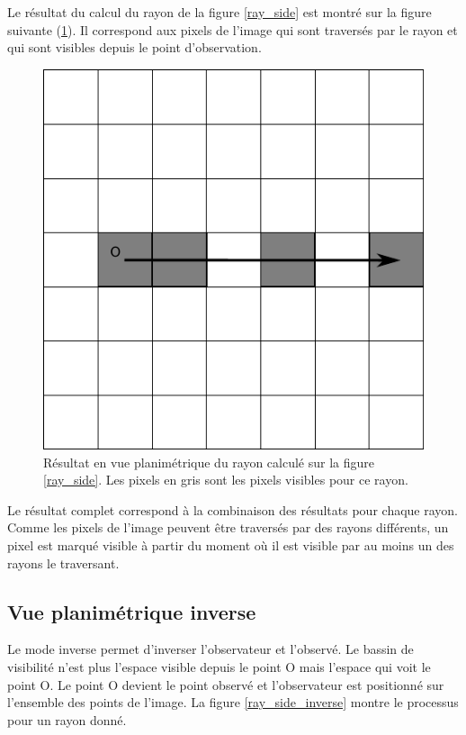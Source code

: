 \documentclass{report}
\begin{document}
Le résultat du calcul du rayon de la figure \ref{ray_side} est montré sur la figure suivante (\ref{grid_result}). Il correspond aux pixels de l'image qui sont traversés par le rayon et qui sont visibles depuis le point d'observation.

\begin{figure}[H]
	\includegraphics[scale=0.8]{img/grid_result.pdf} 
	\caption{Résultat en vue planimétrique du rayon calculé sur la figure \ref{ray_side}. Les pixels en gris sont les pixels visibles pour ce rayon.}
	\label{grid_result}
\end{figure}

Le résultat complet correspond à la combinaison des résultats pour chaque rayon.
Comme les pixels de l'image peuvent être traversés par des rayons différents, un pixel est marqué visible à partir du moment où il est visible par au moins un des rayons le traversant.

\subsection{Vue planimétrique inverse}

Le mode inverse permet d'inverser l'observateur et l'observé. Le bassin de visibilité n'est plus l'espace visible depuis le point O mais l'espace qui voit le point O. Le point O devient le point observé et l'observateur est positionné sur l'ensemble des points de l'image. La figure \ref{ray_side_inverse} montre le processus pour un rayon donné. 
\end{document}
